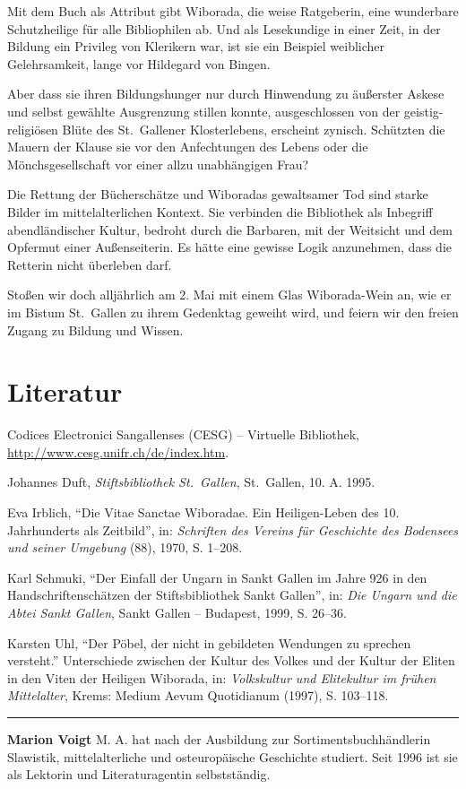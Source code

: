 \documentclass[a4paper,
fontsize=11pt,
oneside,
numbers=noperiodatend,
parskip=half-,
bibliography=totoc,
final
]{scrartcl}
\begin{document}
Mit dem Buch als Attribut gibt Wiborada, die weise Ratgeberin, eine
wunderbare Schutzheilige für alle Bibliophilen ab. Und als Lesekundige
in einer Zeit, in der Bildung ein Privileg von Klerikern war, ist sie
ein Beispiel weiblicher Gelehrsamkeit, lange vor Hildegard von Bingen.

Aber dass sie ihren Bildungshunger nur durch Hinwendung zu äußerster
Askese und selbst gewählte Ausgrenzung stillen konnte, ausgeschlossen
von der geistig-religiösen Blüte des St.~Gallener Klosterlebens,
erscheint zynisch. Schützten die Mauern der Klause sie vor den
Anfechtungen des Lebens oder die Mönchsgesellschaft vor einer allzu
unabhängigen Frau?

Die Rettung der Bücherschätze und Wiboradas gewaltsamer Tod sind starke
Bilder im mittelalterlichen Kontext. Sie verbinden die Bibliothek als
Inbegriff abendländischer Kultur, bedroht durch die Barbaren, mit der
Weitsicht und dem Opfermut einer Außenseiterin. Es hätte eine gewisse
Logik anzunehmen, dass die Retterin nicht überleben darf.

Stoßen wir doch alljährlich am 2. Mai mit einem Glas Wiborada-Wein an,
wie er im Bistum St.~Gallen zu ihrem Gedenktag geweiht wird, und feiern
wir den freien Zugang zu Bildung und Wissen.

\section*{Literatur}\label{literatur}

Codices Electronici Sangallenses (CESG) -- Virtuelle Bibliothek,
\url{http://www.cesg.unifr.ch/de/index.htm}.

Johannes Duft, \emph{Stiftsbibliothek St.~Gallen}, St.~Gallen, 10. A.
1995.

Eva Irblich, \enquote{Die Vitae Sanctae Wiboradae. Ein Heiligen-Leben
des 10. Jahrhunderts als Zeitbild}, in: \emph{Schriften des Vereins für
Geschichte des Bodensees und seiner Umgebung} (88), 1970, S. 1--208.

Karl Schmuki, \enquote{Der Einfall der Ungarn in Sankt Gallen im Jahre
926 in den Handschriftenschätzen der Stiftsbibliothek Sankt Gallen}, in:
\emph{Die Ungarn und die Abtei Sankt Gallen}, Sankt Gallen -- Budapest,
1999, S. 26--36.

Karsten Uhl, \enquote{Der Pöbel, der nicht in gebildeten Wendungen zu
sprechen versteht.} Unterschiede zwischen der Kultur des Volkes und der
Kultur der Eliten in den Viten der Heiligen Wiborada, in:
\emph{Volkskultur und Elitekultur im frühen Mittelalter}, Krems: Medium
Aevum Quotidianum (1997), S. 103--118.

\begin{center}\rule{3in}{0.4pt}\end{center}

\textbf{Marion Voigt} M. A. hat nach der Ausbildung zur
Sortimentsbuchhändlerin Slawistik, mittelalterliche und osteuropäische
Geschichte studiert. Seit 1996 ist sie als Lektorin und Literaturagentin
selbstständig.
\end{document}

